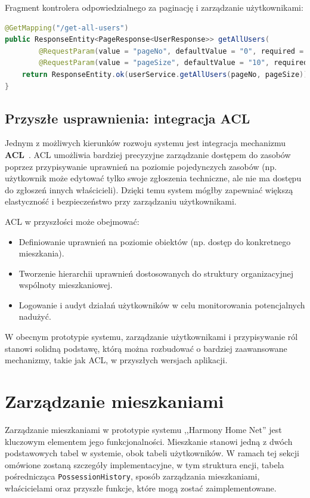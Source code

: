 Fragment kontrolera odpowiedzialnego za paginację i zarządzanie użytkownikami:
\begin{lstlisting}[language=Java, style=JavaStyle, caption=Metoda paginacji w \texttt{UserController}]
@GetMapping("/get-all-users")
public ResponseEntity<PageResponse<UserResponse>> getAllUsers(
        @RequestParam(value = "pageNo", defaultValue = "0", required = false) int pageNo,
        @RequestParam(value = "pageSize", defaultValue = "10", required = false) int pageSize) {
    return ResponseEntity.ok(userService.getAllUsers(pageNo, pageSize));
}
\end{lstlisting}

\subsection{Przyszłe usprawnienia: integracja ACL}

Jednym z możliwych kierunków rozwoju systemu jest integracja mechanizmu \textbf{ACL}~\cite{acl}. ACL umożliwia bardziej precyzyjne zarządzanie dostępem do zasobów poprzez przypisywanie uprawnień na poziomie pojedynczych zasobów (np. użytkownik może edytować tylko swoje zgłoszenia techniczne, ale nie ma dostępu do zgłoszeń innych właścicieli). Dzięki temu system mógłby zapewniać większą elastyczność i bezpieczeństwo przy zarządzaniu użytkownikami.

ACL w przyszłości może obejmować:
\begin{itemize}
    \item Definiowanie uprawnień na poziomie obiektów (np. dostęp do konkretnego mieszkania).
    \item Tworzenie hierarchii uprawnień dostosowanych do struktury organizacyjnej wspólnoty mieszkaniowej.
    \item Logowanie i audyt działań użytkowników w celu monitorowania potencjalnych nadużyć.
\end{itemize}

W obecnym prototypie systemu, zarządzanie użytkownikami i przypisywanie ról stanowi solidną podstawę, którą można rozbudować o bardziej zaawansowane mechanizmy, takie jak ACL, w przyszłych wersjach aplikacji.


\section{Zarządzanie mieszkaniami}

Zarządzanie mieszkaniami w prototypie systemu ,,Harmony Home Net'' jest kluczowym elementem jego funkcjonalności. Mieszkanie stanowi jedną z dwóch podstawowych tabel w systemie, obok tabeli użytkowników. W ramach tej sekcji omówione zostaną szczegóły implementacyjne, w tym struktura encji, tabela pośrednicząca \texttt{PossessionHistory}, sposób zarządzania mieszkaniami, właścicielami oraz przyszłe funkcje, które mogą zostać zaimplementowane.

